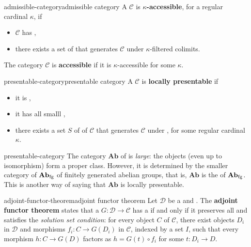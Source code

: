 \begin{topic}{admissible-category}{admissible category}
    A  $\mathcal{C}$ is \textbf{$\kappa$-accessible}, for a regular cardinal $\kappa$, if
    \begin{itemize}
        \item $\mathcal{C}$ has ,
        \item there exists a set of  that generates $\mathcal{C}$ under $\kappa$-filtered colimits.
    \end{itemize}
    The category $\mathcal{C}$ is \textbf{accessible} if it is $\kappa$-accessible for some $\kappa$.
\end{topic}

\begin{topic}{presentable-category}{presentable category}
    A  $\mathcal{C}$ is \textbf{locally presentable} if
    \begin{itemize}
        \item it is ,
        \item it has all smalll ,
        \item there exists a set $S$ of  of $\mathcal{C}$ that generates $\mathcal{C}$ under , for some regular cardinal $\kappa$.
    \end{itemize}
\end{topic}

\begin{example}{presentable-category}
    The category $\textbf{Ab}$ of  is \textit{large}: the objects (even up to isomorphism) form a proper class. However, it is determined by the smaller category of $\textbf{Ab}_\textup{fg}$ of finitely generated abelian groups, that is, $\textbf{Ab}$ is the  of $\textbf{Ab}_\textup{fg}$. This is another way of saying that $\textbf{Ab}$ is locally presentable.
\end{example}

\begin{topic}{adjoint-functor-theorem}{adjoint functor theorem}
    Let $\mathcal{D}$ be a  and  . The \textbf{adjoint functor theorem} states that a  $G : \mathcal{D} \to \mathcal{C}$ has a  if and only if it preserves all  and satisfies the \textit{solution set condition}:
    for every object $C$ of $\mathcal{C}$, there exist objects $D_i$ in $\mathcal{D}$ and morphisms $f_i : C \to G(D_i)$ in $\mathcal{C}$, indexed by a set $I$, such that every morphism $h : C \to G(D)$ factors as $h = G(t) \circ f_i$ for some $t : D_i \to D$.
\end{topic}

